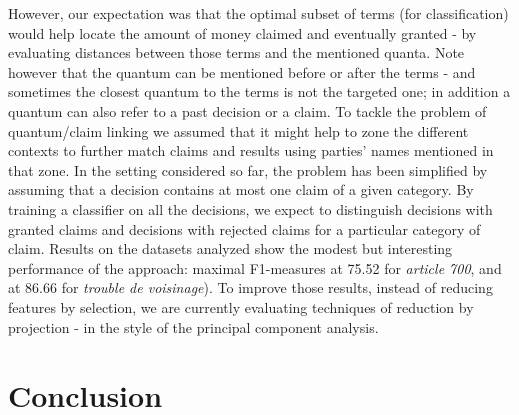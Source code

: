 \documentclass[runningheads,a4paper]{llncs}
\begin{document}
However, our expectation was that the optimal subset of terms (for classification) would help locate the amount of money claimed and eventually granted - by evaluating distances between those terms and the mentioned quanta. Note however that the quantum can be mentioned before or after the terms - and sometimes the closest quantum to the terms is not the targeted one; in addition a quantum can also refer to a past decision or a claim. To tackle the problem of quantum/claim linking we assumed that it might help to zone the different contexts to further match claims and results using parties' names mentioned in that zone. In the setting considered so far, the problem has been simplified by assuming that a decision contains at most one claim of a given category. By training a classifier on all the decisions, we expect to distinguish decisions with granted claims and decisions with rejected claims for a particular category of claim. Results on the datasets analyzed show the modest but interesting performance of the approach: maximal F1-measures at 75.52 for \textit{article 700}, and at 86.66 for \textit{trouble de voisinage}). To improve those results, instead of reducing features by selection, we are currently evaluating techniques of reduction by projection - in the style of the principal component analysis.

\section{Conclusion}
\end{document}
